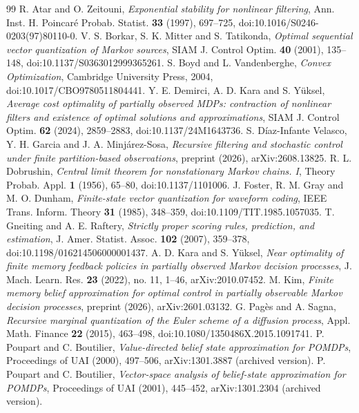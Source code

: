 \begin{thebibliography}{99}
 R. Atar and O. Zeitouni, \emph{Exponential stability for nonlinear filtering}, Ann. Inst. H. Poincar\'e Probab. Statist. \textbf{33} (1997), 697--725, doi:10.1016/S0246-0203(97)80110-0.
 V. S. Borkar, S. K. Mitter and S. Tatikonda, \emph{Optimal sequential vector quantization of Markov sources}, SIAM J. Control Optim. \textbf{40} (2001), 135--148, doi:10.1137/S0363012999365261.
 S. Boyd and L. Vandenberghe, \emph{Convex Optimization}, Cambridge University Press, 2004, doi:10.1017/CBO9780511804441.
 Y. E. Demirci, A. D. Kara and S. Y\"uksel, \emph{Average cost optimality of partially observed MDPs: contraction of nonlinear filters and existence of optimal solutions and approximations}, SIAM J. Control Optim. \textbf{62} (2024), 2859--2883, doi:10.1137/24M1643736.
 S. D\'iaz-Infante Velasco, Y. H. Garcia and J. A. Minj\'arez-Sosa, \emph{Recursive filtering and stochastic control under finite partition-based observations}, preprint (2026), arXiv:2608.13825.
 R. L. Dobrushin, \emph{Central limit theorem for nonstationary Markov chains. I}, Theory Probab. Appl. \textbf{1} (1956), 65--80, doi:10.1137/1101006.
 J. Foster, R. M. Gray and M. O. Dunham, \emph{Finite-state vector quantization for waveform coding}, IEEE Trans. Inform. Theory \textbf{31} (1985), 348--359, doi:10.1109/TIT.1985.1057035.
 T. Gneiting and A. E. Raftery, \emph{Strictly proper scoring rules, prediction, and estimation}, J. Amer. Statist. Assoc. \textbf{102} (2007), 359--378, doi:10.1198/016214506000001437.
 A. D. Kara and S. Y\"uksel, \emph{Near optimality of finite memory feedback policies in partially observed Markov decision processes}, J. Mach. Learn. Res. \textbf{23} (2022), no. 11, 1--46, arXiv:2010.07452.
 M. Kim, \emph{Finite memory belief approximation for optimal control in partially observable Markov decision processes}, preprint (2026), arXiv:2601.03132.
 G. Pag\`es and A. Sagna, \emph{Recursive marginal quantization of the Euler scheme of a diffusion process}, Appl. Math. Finance \textbf{22} (2015), 463--498, doi:10.1080/1350486X.2015.1091741.
 P. Poupart and C. Boutilier, \emph{Value-directed belief state approximation for POMDPs}, Proceedings of UAI (2000), 497--506, arXiv:1301.3887 (archived version).
 P. Poupart and C. Boutilier, \emph{Vector-space analysis of belief-state approximation for POMDPs}, Proceedings of UAI (2001), 445--452, arXiv:1301.2304 (archived version).

\end{thebibliography}
